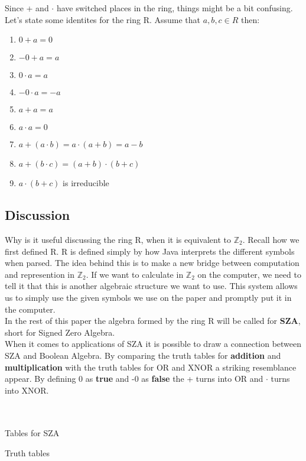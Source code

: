 \documentclass[12pt]{report}
\theoremstyle{definition}
\theoremstyle{remark}
\begin{document}
    Since + and $\cdot$ have switched places in the ring, things might be a bit confusing. Let's state some identites for the ring R. Assume that $a,b,c \in R$ then:
    \begin{enumerate}
      \item $0+a=0$
      \item $-0+a=a$
      \item $0\cdot a=a$
      \item $-0\cdot a =-a$
      \item $a+a=a$
      \item $a\cdot a=0$
      \item $a+(a\cdot b)=a\cdot (a+b) = a-b$
      \item $a+(b\cdot c)=(a+b) \cdot (b+c)$
      \item $a\cdot (b+c)$ is irreducible
    \end{enumerate}
    \newpage

    \subsection{Discussion}
    Why is it useful discussing the ring R, when it is equivalent to $\mathbb{Z}_2$. Recall how we first defined R. R is defined simply by how Java interprets the different symbols when parsed. The idea behind this is to make a new bridge between computation and represention in $\mathbb{Z}_2$. If we want to calculate in $\mathbb{Z}_2$ on the computer, we need to tell it that this is another algebraic structure we want to use. This system allows us to simply use the given symbols we use on the paper and promptly put it in the computer.\\

    In the rest of this paper the algebra formed by the ring R will be called for \textbf{SZA}, short for Signed Zero Algebra.\\

    When it comes to applications of SZA it is possible to draw a connection between SZA and Boolean Algebra. By comparing the truth tables for \textbf{addition} and \textbf{multiplication} with the truth tables for OR and XNOR a striking resemblance appear. By defining 0 as \textbf{true} and -0 as \textbf{false} the + turns into OR and $\cdot$ turns into XNOR.\\\\\\

    \begin{minipage}{230pt}
      Tables for SZA
    \end{minipage}
    \begin{minipage}{\textwidth}
      Truth tables
    \end{minipage}\\
\end{document}
